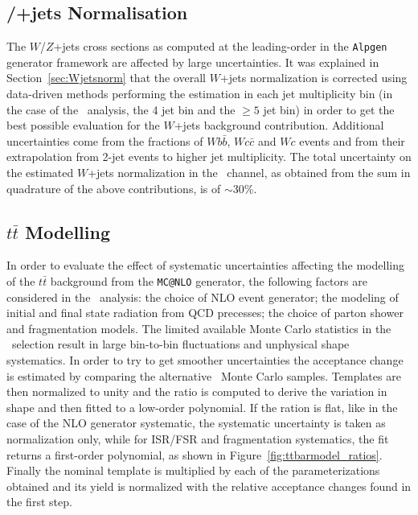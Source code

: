 \subsection{\Wboson/\Zboson+jets Normalisation}
\label{sec:syst_vjetsnormWBX}
The $W$/$Z$+jets cross sections as computed at the
leading-order in the
\texttt{Alpgen} generator framework
are affected by large uncertainties.
It was explained in Section~\ref{sec:Wjetsnorm}
that the overall $W$+jets normalization is 
corrected using data-driven methods 
performing the estimation in each jet multiplicity
bin (in the case of the \wbx\ analysis, the 4 jet bin
and the $\geq 5$ jet bin) in order to get the best
possible evaluation for the $W$+jets background contribution.
Additional uncertainties come from the fractions of $Wb\bar{b}$, $Wc\bar{c}$ and $Wc$
events and from their extrapolation from 2-jet events to higher jet multiplicity. 
The total uncertainty on the estimated $W$+jets normalization
in the \tight\ channel, as obtained from the  sum in quadrature 
of the above contributions, is of $\sim$30\%.



\subsection{$t\bar{t}$ Modelling}
\label{sec:systematic_ttbarmodel}

In order to evaluate the effect of systematic uncertainties 
affecting the modelling of the $t\bar{t}$ background from the
\texttt{MC@NLO} generator, the following factors are considered
in the \wbx\ analysis: the choice of NLO event generator;
the modeling of initial and final state radiation from QCD
precesses; the choice of parton shower and fragmentation models.
The limited available Monte Carlo statistics in 
the \tight\ selection result in 
large bin-to-bin fluctuations and unphysical shape systematics.
In order to try to get smoother uncertainties 
the acceptance change is estimated by comparing 
the alternative \ttbar\ Monte Carlo samples.
Templates are then normalized to unity and the
ratio is computed to derive the variation in shape
and then fitted to a low-order polynomial.
If the ration is flat, like in the case of
the NLO generator systematic, the systematic uncertainty
is taken as normalization only, while 
for ISR/FSR and fragmentation systematics,
the fit returns a  first-order polynomial, as shown in Figure~\ref{fig:ttbarmodel_ratios}.
Finally the nominal template is multiplied by 
each of the parameterizations obtained and 
its yield is normalized with the relative 
acceptance changes found in the first step.


